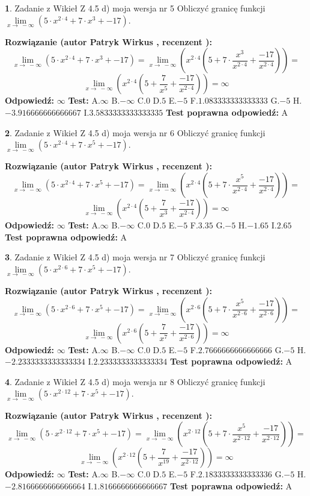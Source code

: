 \documentclass[12pt, a4paper]{article}
\theoremstyle{definition} %
\newtheorem{zad}{}
\newcommand{\zadStart}[1]{\begin{zad}#1\newline}
\newcommand{\zadStop}{\end{zad}}
\newcommand{\rozwStart}[2]{\noindent \textbf{Rozwiązanie (autor #1 , recenzent #2): }\newline}
\newcommand{\rozwStop}{\newline}
\newcommand{\odpStart}{\noindent \textbf{Odpowiedź:}\newline}
\newcommand{\odpStop}{\newline}
\newcommand{\testStart}{\noindent \textbf{Test:}\newline}
\newcommand{\testStop}{\newline}
\newcommand{\kluczStart}{\noindent \textbf{Test poprawna odpowiedź:}\newline}
\newcommand{\kluczStop}{\newline}
\begin{document}
\zadStart{Zadanie z Wikieł Z 4.5 d) moja wersja nr 5}
Obliczyć granicę funkcji  $\lim\limits_{x\to\ -\infty}(5 \cdot x^{2\cdot4}+7 \cdot x^{3}+-17)$.
\zadStop
\rozwStart{Patryk Wirkus}{}
$$\lim\limits_{x\to\ -\infty}(5 \cdot x^{2\cdot4}+7 \cdot x^{3}+-17) = \lim\limits_{x\to\ -\infty}(x^{2\cdot4}(5 +7 \cdot \frac{x^{3}}{x^{2\cdot4}}+\frac{-17}{x^{2\cdot4}})) =$$ $$\lim\limits_{x\to\ -\infty}(x^{2\cdot4}(5 +\frac{7}{x^{5}}+\frac{-17}{x^{2\cdot4}})) =\infty$$
\rozwStop
\odpStart
$\infty$
\odpStop
\testStart
A.$\infty$ B.$-\infty$ C.$0$ D.$5$ E.$-5$
F.$1.083333333333333$ G.$-5$
H.$-3.916666666666667$
I.$3.5833333333333335$
\testStop
\kluczStart
A
\kluczStop



\zadStart{Zadanie z Wikieł Z 4.5 d) moja wersja nr 6}
Obliczyć granicę funkcji  $\lim\limits_{x\to\ -\infty}(5 \cdot x^{2\cdot4}+7 \cdot x^{5}+-17)$.
\zadStop
\rozwStart{Patryk Wirkus}{}
$$\lim\limits_{x\to\ -\infty}(5 \cdot x^{2\cdot4}+7 \cdot x^{5}+-17) = \lim\limits_{x\to\ -\infty}(x^{2\cdot4}(5 +7 \cdot \frac{x^{5}}{x^{2\cdot4}}+\frac{-17}{x^{2\cdot4}})) =$$ $$\lim\limits_{x\to\ -\infty}(x^{2\cdot4}(5 +\frac{7}{x^{3}}+\frac{-17}{x^{2\cdot4}})) =\infty$$
\rozwStop
\odpStart
$\infty$
\odpStop
\testStart
A.$\infty$ B.$-\infty$ C.$0$ D.$5$ E.$-5$
F.$3.35$ G.$-5$
H.$-1.65$
I.$2.65$
\testStop
\kluczStart
A
\kluczStop



\zadStart{Zadanie z Wikieł Z 4.5 d) moja wersja nr 7}
Obliczyć granicę funkcji  $\lim\limits_{x\to\ -\infty}(5 \cdot x^{2\cdot6}+7 \cdot x^{5}+-17)$.
\zadStop
\rozwStart{Patryk Wirkus}{}
$$\lim\limits_{x\to\ -\infty}(5 \cdot x^{2\cdot6}+7 \cdot x^{5}+-17) = \lim\limits_{x\to\ -\infty}(x^{2\cdot6}(5 +7 \cdot \frac{x^{5}}{x^{2\cdot6}}+\frac{-17}{x^{2\cdot6}})) =$$ $$\lim\limits_{x\to\ -\infty}(x^{2\cdot6}(5 +\frac{7}{x^{7}}+\frac{-17}{x^{2\cdot6}})) =\infty$$
\rozwStop
\odpStart
$\infty$
\odpStop
\testStart
A.$\infty$ B.$-\infty$ C.$0$ D.$5$ E.$-5$
F.$2.7666666666666666$ G.$-5$
H.$-2.2333333333333334$
I.$2.2333333333333334$
\testStop
\kluczStart
A
\kluczStop



\zadStart{Zadanie z Wikieł Z 4.5 d) moja wersja nr 8}
Obliczyć granicę funkcji  $\lim\limits_{x\to\ -\infty}(5 \cdot x^{2\cdot12}+7 \cdot x^{5}+-17)$.
\zadStop
\rozwStart{Patryk Wirkus}{}
$$\lim\limits_{x\to\ -\infty}(5 \cdot x^{2\cdot12}+7 \cdot x^{5}+-17) = \lim\limits_{x\to\ -\infty}(x^{2\cdot12}(5 +7 \cdot \frac{x^{5}}{x^{2\cdot12}}+\frac{-17}{x^{2\cdot12}})) =$$ $$\lim\limits_{x\to\ -\infty}(x^{2\cdot12}(5 +\frac{7}{x^{19}}+\frac{-17}{x^{2\cdot12}})) =\infty$$
\rozwStop
\odpStart
$\infty$
\odpStop
\testStart
A.$\infty$ B.$-\infty$ C.$0$ D.$5$ E.$-5$
F.$2.1833333333333336$ G.$-5$
H.$-2.8166666666666664$
I.$1.8166666666666667$
\testStop
\kluczStart
A
\kluczStop
\end{document}
